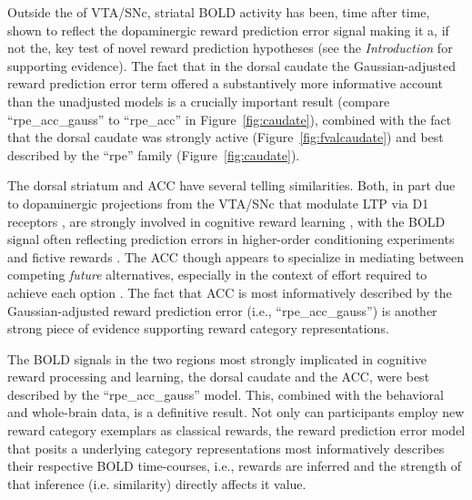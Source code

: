 Outside the of VTA/SNc, striatal BOLD activity has been, time after time, shown to reflect the dopaminergic reward prediction error signal making it a, if not the, key test of novel reward prediction hypotheses (see the \emph{Introduction} for supporting evidence).  The fact that in the dorsal caudate the Gaussian-adjusted reward prediction error term offered a substantively more informative account than the unadjusted models is a crucially important result (compare ``rpe\_acc\_gauss'' to ``rpe\_acc'' in Figure~\ref{fig:caudate}), combined with the fact that the dorsal caudate was strongly active (Figure~\ref{fig:fvalcaudate}) and best described by the ``rpe'' family (Figure~\ref{fig:caudate}).  

The dorsal striatum and ACC have several telling similarities.  Both, in part due to dopaminergic projections from the VTA/SNc that modulate LTP via D1 receptors \cite{Schweimer:2006p9780}, are strongly involved in cognitive reward learning \cite{Atlas:2010p7566,Hayden:2009p6545,Rudebeck:2008p4712,Rolls:2008p7577,Quilodran:2008p2645,Hampton:2007p2983,Ernst:2004p3998}, with the BOLD signal often reflecting prediction errors in higher-order conditioning experiments \cite{seymour:2004aa} and fictive rewards \cite{Hayden:2009p6545}.  The ACC though appears to specialize in mediating between competing \emph{future} alternatives, especially in the context of effort required to achieve each option \cite{Quilodran:2008p2645}.  The fact that ACC is most informatively described by the Gaussian-adjusted reward prediction error (i.e., ``rpe\_acc\_gauss'') is another strong piece of evidence supporting reward category representations.  

 The BOLD signals in the two regions most strongly implicated in cognitive reward processing and learning, the dorsal caudate and the ACC, were best described by the ``rpe\_acc\_gauss'' model.  This, combined with the behavioral and whole-brain data, is a definitive result.  Not only can participants employ new reward category exemplars as classical rewards, the reward prediction error model that posits a underlying category representations most informatively describes their respective BOLD time-courses, i.e., rewards are inferred and the strength of that inference (i.e. similarity) directly affects it value.

